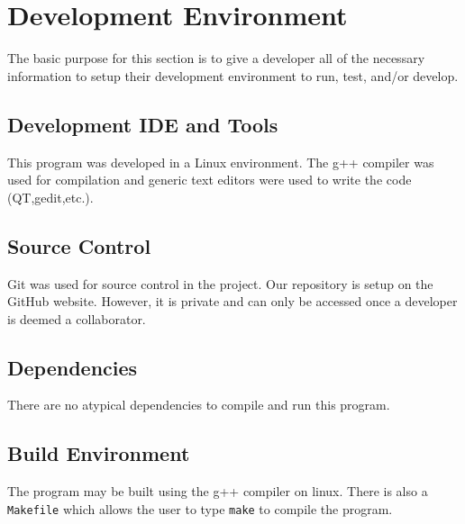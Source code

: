 \chapter{Development Environment}
The basic purpose for this section is to give a developer all of the necessary 
information to setup their development environment to run, test, and/or develop. 


\section{Development IDE and Tools}
This program was developed in a Linux environment. The g++ compiler was used for compilation and generic text editors were used to write the code (QT,gedit,etc.).

\section{Source  Control}
Git was used for source control in the project. Our repository is setup on the GitHub website. However, it is private and can only be accessed once a developer is deemed a collaborator. 


\section{Dependencies}
There are no atypical dependencies to compile and run this program. 

\section{Build  Environment}
The program may be built using the g++ compiler on linux. There is also a {\tt Makefile} which allows the user to type {\tt make} to compile the program.


